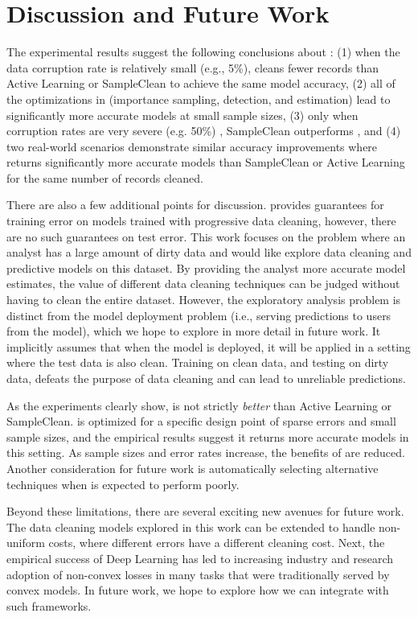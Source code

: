 \vspace{2em}\section{Discussion and Future Work}
The experimental results suggest the following conclusions about \sys: (1) when the data corruption rate is relatively small (e.g., 5\%), \sys cleans fewer records than Active Learning or SampleClean to achieve the same model accuracy, (2) all of the optimizations in \sys (importance sampling, detection, and estimation) lead to significantly more accurate models at small sample sizes, (3) only when corruption rates are very severe (e.g. 50\%) , SampleClean outperforms \sys, and (4) two real-world scenarios demonstrate similar accuracy improvements where \sys returns significantly more accurate models than SampleClean or Active Learning for the same number of records cleaned.

There are also a few additional points for discussion.
\sys provides guarantees for training error on models trained with progressive data cleaning, however, there are no such guarantees on test error. 
This work focuses on the problem where an analyst has a large amount of dirty data and would like explore data cleaning and predictive models on this dataset.
By providing the analyst more accurate model estimates, the value of different data cleaning techniques can be judged without having to clean the entire dataset.
However, the exploratory analysis problem is distinct from the model deployment problem (i.e., serving predictions to users from the model), which we hope to explore in more detail in future work.
It implicitly assumes that when the model is deployed, it will be applied in a setting where the test data is also clean.
Training on clean data, and testing on dirty data, defeats the purpose of data cleaning and can lead to unreliable predictions.

As the experiments clearly show, \sys is not strictly \emph{better} than Active Learning or SampleClean.
\sys is optimized for a specific design point of sparse errors and small sample sizes, and the empirical results suggest it returns more accurate models in this setting.
As sample sizes and error rates increase, the benefits of \sys are reduced.
Another consideration for future work is automatically selecting alternative techniques when \sys is expected to perform poorly.

Beyond these limitations, there are several exciting new avenues for future work.
The data cleaning models explored in this work can be extended to handle non-uniform costs, where different errors have a different cleaning cost.
Next, the empirical success of Deep Learning has led to increasing industry and research adoption of non-convex losses in many tasks that were traditionally served by convex models.
In future work, we hope to explore how we can integrate with such frameworks.

